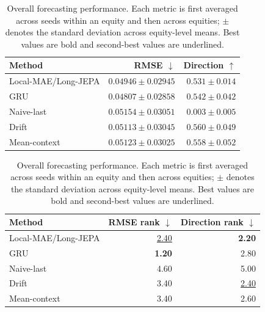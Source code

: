 \begin{table}[t]
\centering
\small
\caption{Overall forecasting performance. Each metric is first averaged across seeds within an equity and then across equities; $\pm$ denotes the standard deviation across equity-level means. Best values are bold and second-best values are underlined.}
\label{tab:main_metrics}
\begin{tabular}{lrr}
\toprule
Method & RMSE $\downarrow$ & Direction $\uparrow$ \\
\midrule
Local-MAE/Long-JEPA & \underline{$0.04946 \pm 0.02945$} & $0.531 \pm 0.014$ \\
GRU & \textbf{$0.04807 \pm 0.02858$} & $0.542 \pm 0.042$ \\
Naive-last & $0.05154 \pm 0.03051$ & $0.003 \pm 0.005$ \\
Drift & $0.05113 \pm 0.03045$ & \textbf{$0.560 \pm 0.049$} \\
Mean-context & $0.05123 \pm 0.03025$ & \underline{$0.558 \pm 0.052$} \\
\bottomrule
\end{tabular}
\par\medskip
\begin{tabular}{lrr}
\toprule
Method & RMSE rank $\downarrow$ & Direction rank $\downarrow$ \\
\midrule
Local-MAE/Long-JEPA & \underline{2.40} & \textbf{2.20} \\
GRU & \textbf{1.20} & 2.80 \\
Naive-last & 4.60 & 5.00 \\
Drift & 3.40 & \underline{2.40} \\
Mean-context & 3.40 & 2.60 \\
\bottomrule
\end{tabular}
\end{table}
